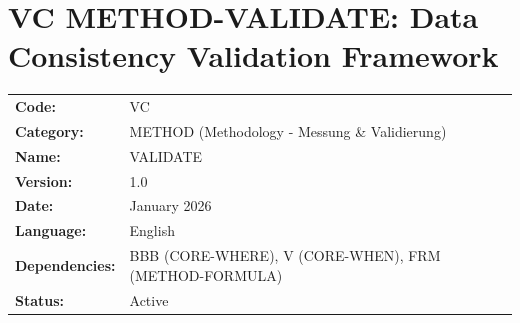 
\chapter{VC METHOD-VALIDATE: Data Consistency Validation Framework}
\label{app:VC}

\begin{tcolorbox}[colback=gray!5!white, colframe=gray!75!black, title=Appendix Header]
\begin{tabular}{ll}
\textbf{Code:} & VC \\
\textbf{Category:} & METHOD (Methodology - Messung \& Validierung) \\
\textbf{Name:} & VALIDATE \\
\textbf{Version:} & 1.0 \\
\textbf{Date:} & January 2026 \\
\textbf{Language:} & English \\
\textbf{Dependencies:} & BBB (CORE-WHERE), V (CORE-WHEN), FRM (METHOD-FORMULA) \\
\textbf{Status:} & Active \\
\end{tabular}
\end{tcolorbox}

